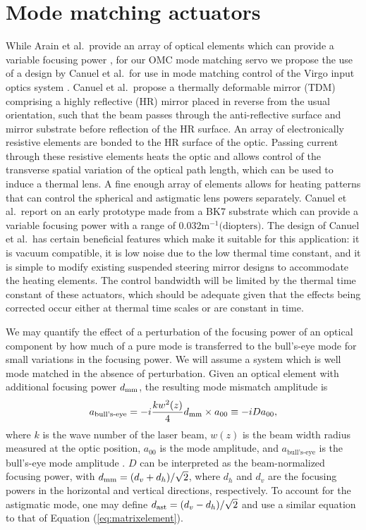 \section{Mode matching actuators}
While Arain et al.\ provide an array of optical elements which can provide a variable focusing power \cite{Arain:10}, for our OMC mode matching servo we propose the use of a design by Canuel et al.\ for use in mode matching control of the Virgo input optics system \cite{Canuel}. %
Canuel et al.\ propose a thermally deformable mirror (TDM) comprising a highly reflective (HR) mirror placed in reverse from the usual orientation, such that the beam passes through the anti-reflective surface and mirror substrate before reflection of the HR surface. %
An array of electronically resistive elements are bonded to the HR surface of the optic. %
Passing current through these resistive elements heats the optic and allows control of the transverse spatial variation of the optical path length, which can be used to induce a thermal lens. %
A fine enough array of elements allows for heating patterns that can control the spherical and astigmatic lens powers separately. %
Canuel et al.\ report on an early prototype made from a BK7 substrate which can provide a variable focusing power with a range of $0.032 \text{m}^{-1} \text{(diopters)}$. %
The design of Canuel et al.\ has certain beneficial features which make it suitable for this application: it is vacuum compatible, it is low noise due to the low thermal time constant, and it is simple to modify existing suspended steering mirror designs to accommodate the heating elements. %
The control bandwidth will be limited by the thermal time constant of these actuators, which should be adequate given that the effects being corrected occur either at thermal time scales or are constant in time.

We may quantify the effect of a perturbation of the focusing power of an optical component by how much of a pure  mode is transferred to the bull's-eye mode for small variations in the focusing power. %
We will assume a system which is well mode matched in the absence of perturbation. %
Given an optical element with additional focusing power $d_{\rm mm}$, the resulting mode mismatch amplitude is
\begin{equation}
\label{eq:matrixelement}
a_{\text{bull's-eye}} = -i\frac{k w^2(z)}{4} d_{\rm mm} \times a_{00}\equiv -iDa_{00},
\end{equation}
where $k$ is the wave number of the laser beam, $w(z)$ is the beam width radius measured at the optic position, $a_{00}$ is the  mode amplitude, and $a_{\text{bull's-eye}}$ is the bull's-eye mode amplitude \cite{ModalModelUpdate4}. %
$D$ can be interpreted as the beam-normalized focusing power, with $d_{\rm mm} = (d_v+d_h)/\sqrt{2}$, where $d_h$  and $d_v$ are the focusing powers in the horizontal and vertical directions, respectively. %
To account for the astigmatic mode, one may define $d_{\rm ast}=(d_v-d_h)/\sqrt{2}$ and use a similar equation to that of Equation (\ref{eq:matrixelement}).

